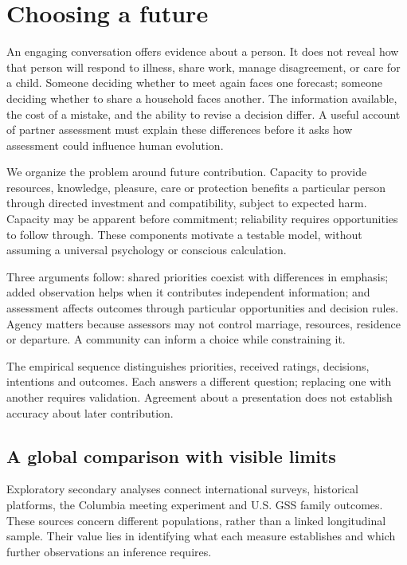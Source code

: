 \section{Choosing a future}\label{sec:minds-future}

An engaging conversation offers evidence about a person. It does not reveal how that person will respond to illness, share work, manage disagreement, or care for a child. Someone deciding whether to meet again faces one forecast; someone deciding whether to share a household faces another. The information available, the cost of a mistake, and the ability to revise a decision differ. A useful account of partner assessment must explain these differences before it asks how assessment could influence human evolution.

We organize the problem around future contribution. Capacity to provide resources, knowledge, pleasure, care or protection benefits a particular person through directed investment and compatibility, subject to expected harm. Capacity may be apparent before commitment; reliability requires opportunities to follow through. These components motivate a testable model, without assuming a universal psychology or conscious calculation.

Three arguments follow: shared priorities coexist with differences in emphasis; added observation helps when it contributes independent information; and assessment affects outcomes through particular opportunities and decision rules. Agency matters because assessors may not control marriage, resources, residence or departure. A community can inform a choice while constraining it.

The empirical sequence distinguishes priorities, received ratings, decisions, intentions and outcomes. Each answers a different question; replacing one with another requires validation. Agreement about a presentation does not establish accuracy about later contribution.

\subsection{A global comparison with visible limits}

Exploratory secondary analyses connect international surveys, historical platforms, the Columbia meeting experiment and U.S. GSS family outcomes. These sources concern different populations, rather than a linked longitudinal sample. Their value lies in identifying what each measure establishes and which further observations an inference requires.

